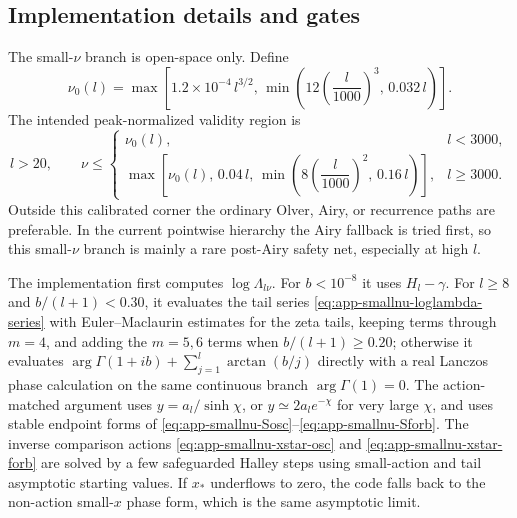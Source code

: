 \documentclass[11pt,a4paper]{article}
\begin{document}
\subsection{Implementation details and gates}

The small-\(\nu\) branch is open-space only.  Define
\begin{equation}
  \nu_0(l)=
  \max\!\left[
  1.2\times10^{-4}\,l^{3/2},\,
  \min\!\left(12\left(\frac{l}{1000}\right)^3,\,0.032\,l\right)
  \right].
  \label{eq:app-smallnu-base-gate}
\end{equation}
The intended peak-normalized validity region is
\begin{equation}
  l>20,\qquad
  \nu\le
  \begin{cases}
    \nu_0(l), & l<3000,\\[3pt]
    \max\!\left[
      \nu_0(l),\,0.04\,l,\,
      \min\!\left(8\left(\dfrac{l}{1000}\right)^2,\,0.16\,l\right)
    \right], & l\ge3000 .
  \end{cases}
  \label{eq:app-smallnu-gate}
\end{equation}
Outside this calibrated corner the ordinary Olver, Airy, or recurrence paths
are preferable.  In the current pointwise hierarchy the Airy fallback is tried
first, so this small-\(\nu\) branch is mainly a rare post-Airy safety net,
especially at high \(l\).

The implementation first computes \(\log\Lambda_{l\nu}\).  For
\(b<10^{-8}\) it uses \(H_l-\gamma\).  For \(l\ge8\) and
\(b/(l+1)<0.30\), it evaluates the tail series
\eqref{eq:app-smallnu-loglambda-series} with Euler--Maclaurin estimates for
the zeta tails, keeping terms through \(m=4\), and adding the \(m=5,6\) terms
when \(b/(l+1)\ge0.20\); otherwise it evaluates
\(\arg\Gamma(1+ib)+\sum_{j=1}^{l}\arctan(b/j)\) directly with a real
Lanczos phase calculation on the same continuous branch
\(\arg\Gamma(1)=0\).  The action-matched argument uses
\(y=a_l/\sinh\chi\), or \(y\simeq2a_l e^{-\chi}\) for very large \(\chi\), and
uses stable endpoint forms of \eqref{eq:app-smallnu-Sosc}--\eqref{eq:app-smallnu-Sforb}.
The inverse comparison actions \eqref{eq:app-smallnu-xstar-osc} and
\eqref{eq:app-smallnu-xstar-forb} are solved by a few safeguarded Halley steps
using small-action and tail asymptotic starting values.  If \(x_*\) underflows
to zero, the code falls back to the non-action small-\(x\) phase form, which is
the same asymptotic limit.
\end{document}
